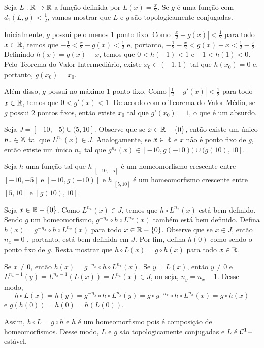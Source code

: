 \begin{example}
Seja $L: \mathbb{R} \to \mathbb{R}$ a função definida por $L(x) = \frac{x}{2}$. Se $g$ é uma função com $d_1(L, g) < \frac{1}{2}$, vamos mostrar que $L$ e $g$ são topologicamente conjugadas.

Inicialmente, $g$ possui pelo menos 1 ponto fixo. Como $\left| \frac{x}{2} - g(x) \right| < \frac{1}{2}$ para todo $x \in \mathbb{R}$, temos que $-\frac{1}{2} < \frac{x}{2} - g(x) < \frac{1}{2}$ e, portanto, $-\frac{1}{2} - \frac{x}{2} < g(x) - x < \frac{1}{2} - \frac{x}{2}$. Definindo $h(x) = g(x) - x$, temos que $0 < h(-1) < 1$ e $-1 < h(1) < 0$. Pelo Teorema do Valor Intermediário, existe $x_0 \in (-1, 1)$ tal que $h(x_0) = 0$ e, portanto, $g(x_0) = x_0$.

Além disso, $g$ possui no máximo 1 ponto fixo. Como $\left| \frac{1}{2} - g'(x) \right| < \frac{1}{2}$ para todo $x \in \mathbb{R}$, temos que $0 < g'(x) < 1$. De acordo com o Teorema do Valor Médio, se $g$ possui $2$ pontos fixos, então existe $x_0$ tal que $g'(x_0) = 1$, o que é um absurdo.

Seja $J = [-10, -5) \cup (5, 10]$. Observe que se $x \in \mathbb{R} - \{0\}$, então existe um único $n_x \in \mathbb{Z}$ tal que $L^{n_x}(x) \in J$. Analogamente, se $x \in \mathbb{R}$ e $x$ não é ponto fixo de $g$, então existe um único $n_x$ tal que $g^{n_x}(x) \in [-10, g(-10)) \cup (g(10), 10]$.

Seja $h$ uma função tal que $h|_{[-10, -5]}$ é um homeomorfismo crescente entre $[-10, -5]$ e $[-10, g(-10)]$ e $h|_{[5, 10]}$ é um homeomorfismo crescente entre $[5, 10]$ e $[g(10), 10]$.

Seja $x \in \mathbb{R} - \{0\}$. Como $L^{n_x}(x) \in J$, temos que $h \circ L^{n_x}(x)$ está bem definido. Sendo $g$ um homeomorfismo, $g^{-n_x} \circ h \circ L^{n_x}(x)$ também está bem definido. Defina $h(x) = g^{-n_x} \circ h \circ L^{n_x}(x)$ para todo $x \in \mathbb{R} - \{0\}$. Observe que se $x \in J$, então $n_x = 0$ , portanto, está bem definida em $J$. Por fim, defina $h(0)$ como sendo o ponto fixo de $g$. Resta mostrar que $h \circ L(x) = g \circ h(x)$ para todo $x \in \mathbb{R}$.

Se $x \neq 0$, então $h(x) = g^{-n_x} \circ h \circ L^{n_x}(x)$. Se $y = L(x)$, então $y \neq 0$ e $L^{n_x - 1}(y) = L^{n_x - 1}(L(x)) = L^{n_x}(x) \in J$, ou seja, $n_y = n_x - 1$. Desse modo,
$$h \circ L(x) = h(y) = g^{-n_y} \circ h \circ L^{n_y}(y) = g \circ g^{-n_x} \circ h \circ L^{n_x}(x) = g \circ h(x)$$
e $g(h(0)) = h(0) = h(L(0))$.

Assim, $h \circ L = g \circ h$ e $h$ é um homeomorfismo pois é composição de homeomorfismos. Desse modo, $L$ e $g$ são topologicamente conjugadas e $L$ é $\mathcal{C}^1-$estável.
\end{example}

